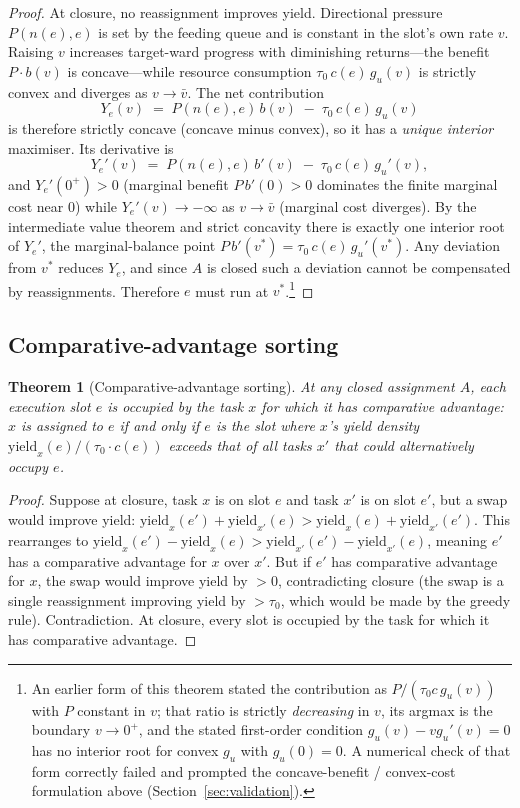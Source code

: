 \documentclass[11pt,twocolumn,a4paper]{article}
\theoremstyle{plain}
\newtheorem{theorem}{Theorem}[section]
\theoremstyle{definition}
\theoremstyle{remark}
\newcommand{\tick}{\tau_0}
\newcommand{\yield}{\mathrm{yield}}
\newcommand{\pres}{P}
\begin{document}
\begin{proof}
At closure, no reassignment improves yield. Directional pressure $\pres(n(e),e)$ is set by the feeding queue and is constant in the slot's own rate $v$. Raising $v$ increases target-ward progress with diminishing returns---the benefit $\pres\cdot b(v)$ is concave---while resource consumption $\tick\, c(e)\, g_u(v)$ is strictly convex and diverges as $v\to\bar v$. The net contribution
\[
  Y_e(v) \;=\; \pres(n(e), e)\, b(v)\;-\;\tick\, c(e)\, g_u(v)
\]
is therefore strictly concave (concave minus convex), so it has a \emph{unique interior} maximiser. Its derivative is
\[
  Y_e'(v) \;=\; \pres(n(e), e)\, b'(v)\;-\;\tick\, c(e)\, g_u'(v),
\]
and $Y_e'(0^+)>0$ (marginal benefit $\pres\,b'(0)>0$ dominates the finite marginal cost near $0$) while $Y_e'(v)\to-\infty$ as $v\to\bar v$ (marginal cost diverges). By the intermediate value theorem and strict concavity there is exactly one interior root of $Y_e'$, the marginal-balance point $\pres\, b'(v^*)=\tick\, c(e)\, g_u'(v^*)$. Any deviation from $v^*$ reduces $Y_e$, and since $A$ is closed such a deviation cannot be compensated by reassignments. Therefore $e$ must run at $v^*$.\footnote{An earlier form of this theorem stated the contribution as $\pres/(\tick c\, g_u(v))$ with $\pres$ constant in $v$; that ratio is strictly \emph{decreasing} in $v$, its argmax is the boundary $v\to 0^+$, and the stated first-order condition $g_u(v)-v g_u'(v)=0$ has no interior root for convex $g_u$ with $g_u(0)=0$. A numerical check of that form correctly failed and prompted the concave-benefit / convex-cost formulation above (Section~\ref{sec:validation}).}
\end{proof}

\subsection{Comparative-advantage sorting}

\begin{theorem}[Comparative-advantage sorting]
\label{thm:sorting}
At any closed assignment $A$, each execution slot $e$ is occupied by the task $x$ for which it has comparative advantage: $x$ is assigned to $e$ if and only if $e$ is the slot where $x$'s yield density $\yield_x(e)/(\tick \cdot c(e))$ exceeds that of all tasks $x'$ that could alternatively occupy $e$.
\end{theorem}

\begin{proof}
Suppose at closure, task $x$ is on slot $e$ and task $x'$ is on slot $e'$, but a swap would improve yield: $\yield_x(e') + \yield_{x'}(e) > \yield_x(e) + \yield_{x'}(e')$. This rearranges to $\yield_x(e') - \yield_x(e) > \yield_{x'}(e') - \yield_{x'}(e)$, meaning $e'$ has a comparative advantage for $x$ over $x'$. But if $e'$ has comparative advantage for $x$, the swap would improve yield by $> 0$, contradicting closure (the swap is a single reassignment improving yield by $> \tick$, which would be made by the greedy rule). Contradiction. At closure, every slot is occupied by the task for which it has comparative advantage.
\end{proof}
\end{document}
